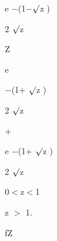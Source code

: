 \documentclass[a4paper,portrait,12pt]{article}
\begin{document}
\begin{flushleft}
e $-$(1$-$$\surd$z )
\end{flushleft}


\begin{flushleft}
2 $\surd$z
\end{flushleft}





\begin{flushleft}
Z
\end{flushleft}





\begin{flushleft}
e
\end{flushleft}





\begin{flushleft}
$-$(1+ $\surd$z )
\end{flushleft}





\begin{flushleft}
2 $\surd$z
\end{flushleft}





+





\begin{flushleft}
e $-$(1+ $\surd$z )
\end{flushleft}


\begin{flushleft}
2 $\surd$z
\end{flushleft}





\begin{flushleft}
0$<$z$<$1
\end{flushleft}


\begin{flushleft}
z $>$ 1.
\end{flushleft}





\begin{flushleft}
fZ
\end{flushleft}
\end{document}
